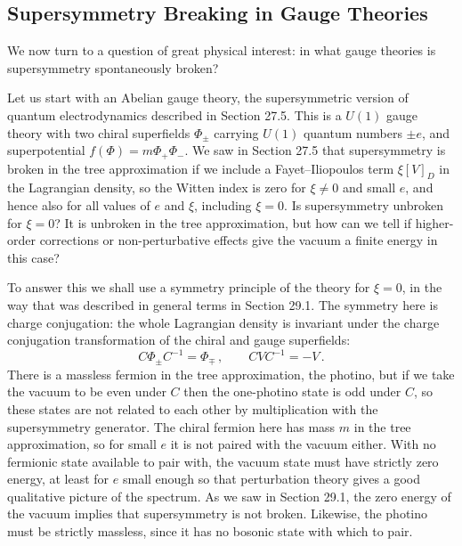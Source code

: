 
\subsection{Supersymmetry Breaking in Gauge Theories}

We now turn to a question of great physical interest: in what gauge
theories is supersymmetry spontaneously broken?

Let us start with an Abelian gauge theory, the supersymmetric version of
quantum electrodynamics described in Section 27.5. This is a \(U(1)\) gauge
theory with two chiral superfields \(\Phi_\pm\) carrying \(U(1)\) quantum
numbers \(\pm e\), and superpotential
\(f(\Phi)=m\Phi_+\Phi_-\). We saw in Section 27.5 that supersymmetry is
broken in the tree approximation if we include a Fayet--Iliopoulos term
\(\xi[V]_D\) in the Lagrangian density, so the Witten index is zero for
\(\xi\neq0\) and small \(e\), and hence also for all values of \(e\) and
\(\xi\), including \(\xi=0\). Is supersymmetry unbroken for \(\xi=0\)?
It is unbroken in the tree approximation, but how can we tell if
higher-order corrections or non-perturbative effects give the vacuum a
finite energy in this case?

To answer this we shall use a symmetry principle of the theory for
\(\xi=0\), in the way that was described in general terms in Section 29.1.
The symmetry here is charge conjugation: the whole Lagrangian density is
invariant under the charge conjugation transformation of the chiral and
gauge superfields:
\begin{equation}
  C\Phi_\pm C^{-1}=\Phi_\mp\,,
  \qquad
  CVC^{-1}=-V\,.
  \tag{29.4.1}\label{eq:29.4.1}
\end{equation}
There is a massless fermion in the tree approximation, the photino, but if
we take the vacuum to be even under \(C\) then the one-photino state is odd
under \(C\), so these states are not related to each other by multiplication
with the supersymmetry generator. The chiral fermion here has mass \(m\) in
the tree approximation, so for small \(e\) it is not paired with the vacuum
either. With no fermionic state available to pair with, the vacuum state must
have strictly zero energy, at least for \(e\) small enough so that
perturbation theory gives a good qualitative picture of the spectrum. As we
saw in Section 29.1, the zero energy of the vacuum implies that
supersymmetry is not broken. Likewise, the photino must be strictly
massless, since it has no bosonic state with which to pair.

